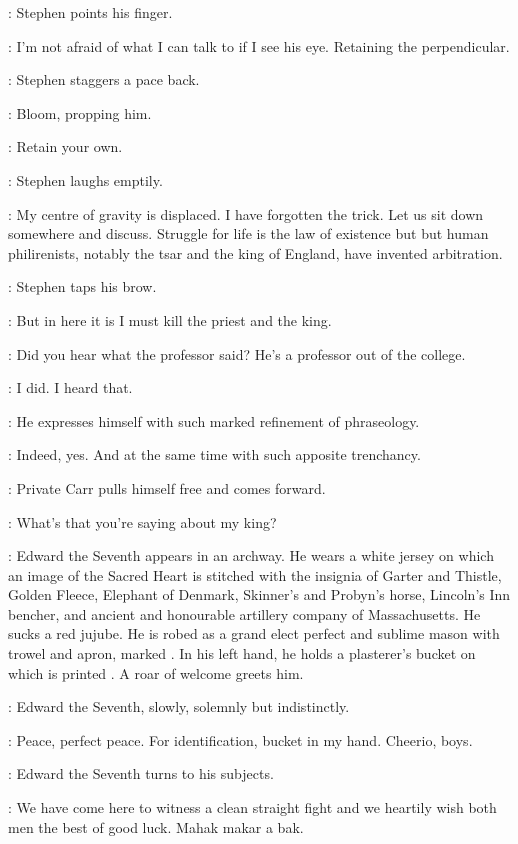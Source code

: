 :
Stephen points his finger.

\Stephen:
I'm not afraid of what I can talk to if I see his eye.
Retaining the perpendicular.

:
Stephen staggers a pace back.

:
Bloom, propping him.

\Bloom:
Retain your own.

:
Stephen laughs emptily.

\Stephen:
My centre of gravity is displaced.
I have forgotten the trick.
Let us sit down somewhere and discuss.
Struggle for life is the law of existence but but human philirenists,
notably the tsar and the king of England, have invented arbitration.

:
Stephen taps his brow.

\Stephen:
But in here it is I must kill the priest and the king.

\BiddyClap[2]:
Did you hear what the professor said?
He's a professor out of the college.

\CuntyKate[2]:
I did.
I heard that.

\BiddyClap[2]:
He expresses himself with such marked refinement of phraseology.

\CuntyKate[2]:
Indeed, yes.
And at the same time with such apposite trenchancy.

:
Private Carr pulls himself free and comes forward.

\Carr:
What's that you're saying about my king?

:
Edward the Seventh appears in an archway.
He wears a white jersey on which an image of the Sacred Heart
is stitched with the insignia of Garter and Thistle,
Golden Fleece, Elephant of Denmark, Skinner's and Probyn's horse,
Lincoln's Inn bencher,
and ancient and honourable artillery company of Massachusetts.
He sucks a red jujube.
He is robed as a grand elect perfect and sublime mason
with trowel and apron, marked .
In his left hand, he holds a plasterer's bucket on which
is printed .
A roar of welcome greets him.

:
Edward the Seventh, slowly, solemnly but indistinctly.

\EdwardSeventh:
Peace, perfect peace.
For identification, bucket in my hand.
Cheerio, boys.

:
Edward the Seventh turns to his subjects.

\EdwardSeventh:
We have come here to witness a clean straight fight
and we heartily wish both men the best of good luck.
Mahak makar a bak.

